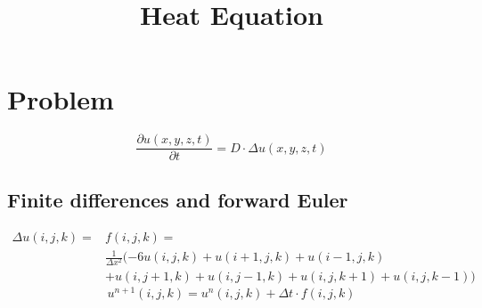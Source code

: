\documentclass[a4paper,10pt]{scrartcl}
\title{Heat Equation}
\author{}
\begin{document}
\maketitle

\section{Problem}
\[\frac{\partial u(x,y,z,t)}{\partial t} = D\cdot \Delta u(x,y,z,t)\]
\subsection{Finite differences and forward Euler}
\begin{align*}
 \Delta u(i,j,k)=& f(i,j,k) = \\
 &\frac{1}{\Delta x^2} ( -6u(i,j,k)+u(i+1,j,k)+u(i-1,j,k)\\&+u(i,j+1,k)+u(i,j-1,k)+u(i,j,k+1)+u(i,j,k-1))
\end{align*}
\[u^{n+1}(i,j,k)=u^{n}(i,j,k)+\Delta t \cdot f(i,j,k)\]
\end{document}
